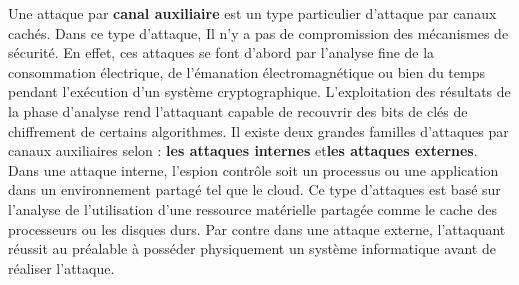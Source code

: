 \par

Une attaque par \textbf{canal auxiliaire} est un type particulier d’attaque par canaux cachés. Dans ce type d’attaque, Il n’y a pas de compromission des mécanismes de sécurité. En effet, ces attaques se font d’abord par l’analyse fine de  la consommation électrique, de l’émanation électromagnétique  ou bien du temps pendant  l’exécution  d’un  système cryptographique. L’exploitation des résultats de la phase d'analyse rend l’attaquant  capable   de  recouvrir des bits de clés de chiffrement de certains algorithmes. 
Il existe deux grandes familles d’attaques par canaux auxiliaires selon \cite{sidechannelattack}: \textbf{les attaques internes} et\textbf{les attaques externes}. Dans une attaque interne, l’espion contrôle soit  un processus ou une application dans un environnement partagé tel que  le cloud. Ce type d’attaques est basé sur  l’analyse de l’utilisation d’une ressource matérielle partagée comme le cache des processeurs ou les disques durs. Par contre dans une attaque externe, l’attaquant  réussit  au préalable à posséder physiquement un système informatique avant de réaliser l’attaque. \newline{}

\par


